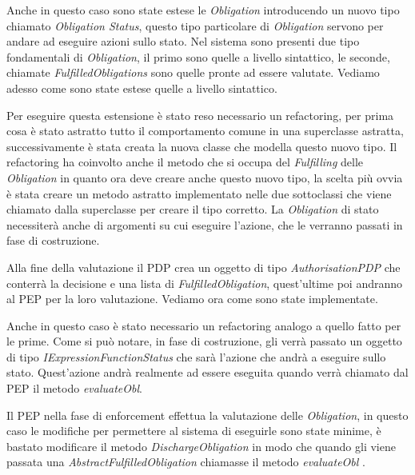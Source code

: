Anche in questo caso sono state estese le \textit{Obligation} introducendo un nuovo tipo chiamato \textit{Obligation Status}, questo tipo particolare di \textit{Obligation} servono per andare ad eseguire azioni sullo stato.
Nel sistema sono presenti due tipo fondamentali di \textit{Obligation}, il primo sono quelle a livello sintattico, le seconde, chiamate \textit{FulfilledObligations} sono quelle pronte ad essere valutate. Vediamo adesso come sono state estese quelle a livello sintattico.\\ \par
Per eseguire questa estensione è stato reso necessario un refactoring, per prima cosa è stato astratto tutto il comportamento comune in una superclasse astratta, successivamente è stata creata la nuova classe che modella questo nuovo tipo.
Il refactoring ha coinvolto anche il metodo che si occupa del \textit{Fulfilling} delle \textit{Obligation} in quanto ora deve creare anche questo nuovo tipo, la scelta più ovvia è stata creare un metodo astratto implementato nelle due sottoclassi che viene chiamato dalla superclasse per creare il tipo corretto.
La \textit{Obligation} di stato necessiterà anche di argomenti su cui eseguire l'azione, che le verranno passati in fase di costruzione.\\ \par
Alla fine della valutazione il PDP crea un oggetto di tipo \textit{AuthorisationPDP} che conterrà la decisione e una lista di \textit{FulfilledObligation}, quest'ultime poi andranno al PEP per la loro valutazione. Vediamo ora come sono state implementate.\\ \par
Anche in questo caso è stato necessario un refactoring analogo a quello fatto per le prime.
Come si può notare, in fase di costruzione, gli verrà passato un oggetto di tipo \textit{IExpressionFunctionStatus} che sarà l'azione che andrà a eseguire sullo stato. Quest'azione andrà realmente ad essere eseguita quando verrà chiamato dal PEP il metodo \textit{evaluateObl}.\\ \par
Il PEP nella fase di enforcement effettua la valutazione delle \textit{Obligation}, in questo caso le modifiche per permettere al sistema di eseguirle sono state minime, è bastato modificare il metodo \textit{DischargeObligation} in modo che quando gli viene passata una \textit{AbstractFulfilledObligation} chiamasse il metodo \textit{evaluateObl} .


